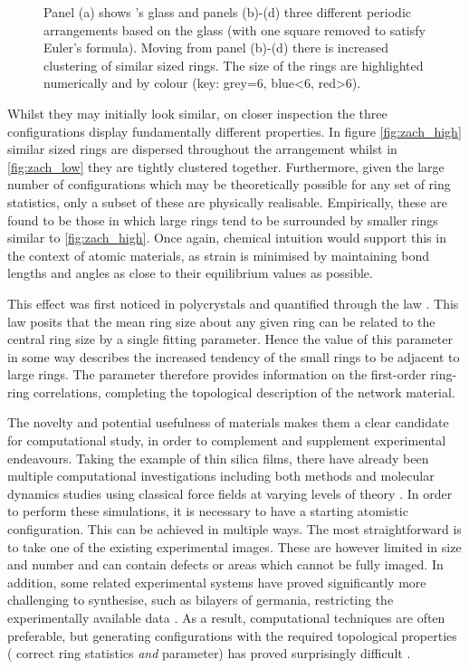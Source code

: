 \begin{figure}[h]
     \caption{Panel (a) shows \zach's glass and panels (b)\--(d) three different periodic arrangements based on the glass (with one square removed to satisfy Euler's formula). Moving from panel (b)\--(d) there is increased clustering of similar sized rings. The size of the rings are highlighted numerically and by colour (key: grey=6, blue<6, red>6).}
     \label{fig:zach}
\end{figure}

Whilst they may initially look similar, on closer inspection the three configurations display fundamentally different properties.
In figure \ref{fig:zach_high} similar sized rings are dispersed throughout the arrangement whilst in \ref{fig:zach_low} they are tightly clustered together.
Furthermore, given the large number of configurations which may be theoretically possible for any set of ring statistics, only a subset of these are physically realisable.
Empirically, these are found to be those in which large rings tend to be surrounded by smaller rings \ie{} similar to \ref{fig:zach_high}.
Once again, chemical intuition would support this in the context of atomic materials, as strain is minimised by maintaining bond lengths and angles as close to their equilibrium values as possible.

This effect was first noticed in polycrystals and quantified through the \aw{} law \cite{Aboav1970,Weaire1974}.
This law posits that the mean ring size about any given ring can be related to the central ring size by a single fitting parameter.
Hence the value of this parameter in some way describes the increased tendency of the small rings to be adjacent to large rings.
The \aw{} parameter therefore provides information on the first\--order ring\--ring correlations, completing the topological description of the network material.

The novelty and potential usefulness of \td{} materials makes them a  clear candidate for computational study, in order to complement and supplement experimental endeavours. 
Taking the example of thin silica films, there have already been multiple computational investigations including both \abinitio{} methods and molecular dynamics studies using classical force fields at varying levels of theory \cite{Bjorkman2013,Malashevich2016,Wilson2013,Wilson2018,Zhang2018a,Bamer2019,Roy2019,Richter2019}.
In order to perform these simulations, it is necessary to have a starting atomistic configuration.
This can be achieved in multiple ways. 
The most straightforward is to take one of the existing experimental images. 
These are however limited in size and number and can contain defects or areas which cannot be fully imaged.
In addition, some related experimental systems have proved significantly more challenging to synthesise, such as bilayers of germania, restricting the experimentally available data  \cite{Lewandowski2018,Lewandowski2019}.
As a result, computational techniques are often preferable, but generating configurations with the required topological properties (\ie{} correct ring statistics \textit{and} \aw{} parameter) has proved surprisingly difficult \cite{Roy2018,Kumar2014}.

